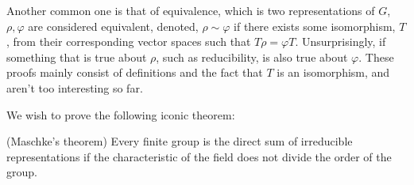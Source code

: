\documentclass{article}
\renewcommand{\phi}{\varphi}
\begin{document}
Another common one is that of equivalence, which is two representations of $G$, $\rho, \phi$  are considered equivalent, denoted, $\rho \sim \phi$ if there exists some isomorphism, $T$, from their corresponding vector spaces such that $T\rho=\phi T$. Unsurprisingly, if something that is true about $\rho$, such as reducibility, is also true about $\phi$. These proofs mainly consist of definitions and the fact that $T$ is an isomorphism, and aren't too interesting so far.

We wish to prove the following iconic theorem:

\begin{theorem}
(Maschke's theorem) Every finite group is the direct sum of irreducible representations if the characteristic of the field does not divide the order of the group.
\end{theorem}
\end{document}

